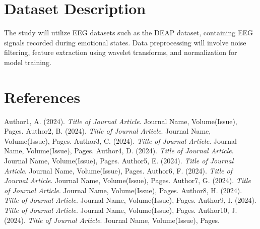 \documentclass[a4paper,10pt]{article}
\begin{document}
\section{Dataset Description}
The study will utilize EEG datasets such as the DEAP dataset, containing EEG signals recorded during emotional states. Data preprocessing will involve noise filtering, feature extraction using wavelet transforms, and normalization for model training.

\section{References}
\begin{thebibliography}{10}
 Author1, A. (2024). \textit{Title of Journal Article}. Journal Name, Volume(Issue), Pages.
 Author2, B. (2024). \textit{Title of Journal Article}. Journal Name, Volume(Issue), Pages.
 Author3, C. (2024). \textit{Title of Journal Article}. Journal Name, Volume(Issue), Pages.
 Author4, D. (2024). \textit{Title of Journal Article}. Journal Name, Volume(Issue), Pages.
 Author5, E. (2024). \textit{Title of Journal Article}. Journal Name, Volume(Issue), Pages.
 Author6, F. (2024). \textit{Title of Journal Article}. Journal Name, Volume(Issue), Pages.
 Author7, G. (2024). \textit{Title of Journal Article}. Journal Name, Volume(Issue), Pages.
 Author8, H. (2024). \textit{Title of Journal Article}. Journal Name, Volume(Issue), Pages.
 Author9, I. (2024). \textit{Title of Journal Article}. Journal Name, Volume(Issue), Pages.
 Author10, J. (2024). \textit{Title of Journal Article}. Journal Name, Volume(Issue), Pages.
\end{thebibliography}
\end{document}
